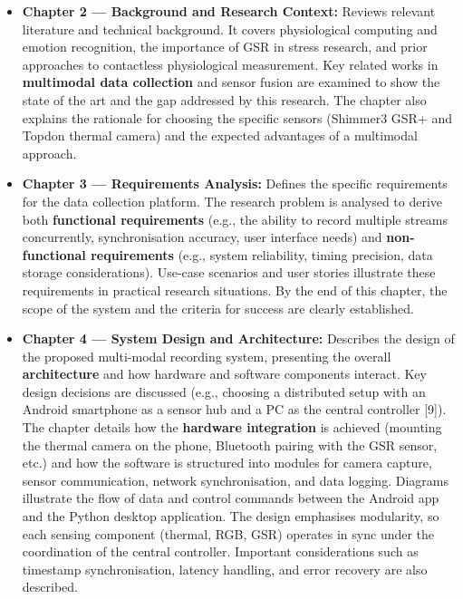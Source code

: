\begin{itemize}
  \item \textbf{Chapter 2 --- Background and Research Context:} Reviews relevant literature and technical background. It covers physiological computing and emotion recognition, the importance of GSR in stress research, and prior approaches to contactless physiological measurement. Key related works in \textbf{multimodal data collection} and sensor fusion are examined to show the state of the art and the gap addressed by this research. The chapter also explains the rationale for choosing the specific sensors (Shimmer3 GSR+ and Topdon thermal camera) and the expected advantages of a multimodal approach.
  \item \textbf{Chapter 3 --- Requirements Analysis:} Defines the specific requirements for the data collection platform. The research problem is analysed to derive both \textbf{functional requirements} (e.g., the ability to record multiple streams concurrently, synchronisation accuracy, user interface needs) and \textbf{non-functional requirements} (e.g., system reliability, timing precision, data storage considerations). Use-case scenarios and user stories illustrate these requirements in practical research situations. By the end of this chapter, the scope of the system and the criteria for success are clearly established.
  \item \textbf{Chapter 4 --- System Design and Architecture:} Describes the design of the proposed multi-modal recording system, presenting the overall \textbf{architecture} and how hardware and software components interact. Key design decisions are discussed (e.g., choosing a distributed setup with an Android smartphone as a sensor hub and a PC as the central controller [9]). The chapter details how the \textbf{hardware integration} is achieved (mounting the thermal camera on the phone, Bluetooth pairing with the GSR sensor, etc.) and how the software is structured into modules for camera capture, sensor communication, network synchronisation, and data logging. Diagrams illustrate the flow of data and control commands between the Android app and the Python desktop application. The design emphasises modularity, so each sensing component (thermal, RGB, GSR) operates in sync under the coordination of the central controller. Important considerations such as timestamp synchronisation, latency handling, and error recovery are also described.

\end{itemize}
